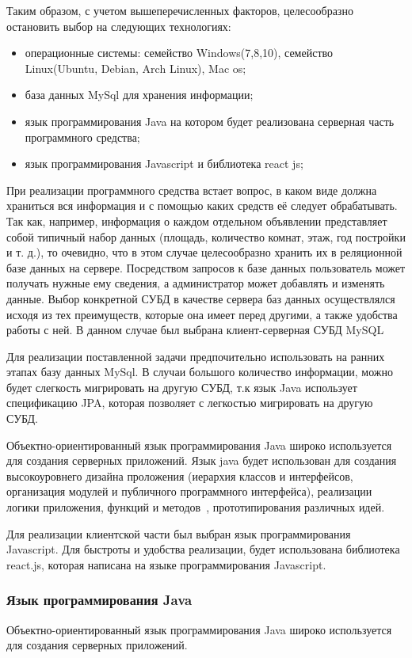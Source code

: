 Таким образом, с учетом вышеперечисленных факторов, целесообразно остановить выбор на следующих технологиях:
\begin{itemize}
  \item операционные системы: семейство Windows(7,8,10), семейство Linux(Ubuntu, Debian, Arch Linux), Mac os;
  \item база данных MySql для хранения информации;
  \item язык программирования Java на котором будет реализована серверная часть программного средства;
  \item язык программирования Javascript и библиотека react js;
\end{itemize}
При реализации программного средства встает вопрос, в каком виде должна храниться вся информация и с помощью каких средств её следует обрабатывать. Так как, например, информация о каждом отдельном объявлении представляет собой типичный набор данных (площадь, количество комнат, этаж, год постройки и т. д.), то очевидно, что в этом случае целесообразно хранить их в реляционной базе данных на сервере. Посредством запросов к базе данных пользователь может получать нужные ему сведения, а администратор может добавлять и изменять данные. Выбор конкретной СУБД в качестве сервера баз данных осуществлялся исходя из тех преимуществ, которые она имеет перед другими, а также удобства работы с ней. В данном случае был выбрана клиент-серверная СУБД MySQL

Для реализации поставленной задачи предпочительно использовать на ранних этапах базу данных MySql. В случаи большого количество информации, можно будет слегкость мигрировать на другую СУБД, т.к язык Java использует спецификацию JPA, которая позволяет с легкостью мигрировать на другую СУБД.

Объектно-ориентированный язык программирования Java широко используется для создания серверных приложений. Язык java будет использован для создания высокоуровнего дизайна проложения (иерархия классов и интерфейсов, организация модулей и публичного программного интерфейса), реализации логики приложения, функций и методов~\cite{dpir_2007}, прототипирования различных идей.

Для реализации клиентской части был выбран язык программирования Javascript. Для быстроты и удобства реализации, будет использована библиотека react.js, которая написана на языке программирования Javascript. 


\subsubsection{Язык программирования Java}
\label{sub:practice:ruby_overview}
Объектно-ориентированный язык программирования Java широко используется для создания серверных приложений.

